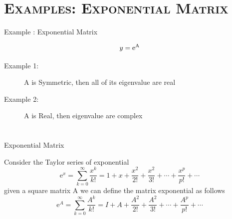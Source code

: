\documentclass[xcolor=x11names,compress]{beamer}
\renewcommand{\(}{\begin{columns}}
\renewcommand{\)}{\end{columns}}
\newcommand{\<}[1]{\begin{column}{#1}}
\renewcommand{\>}{\end{column}}
\begin{document}
\section{\scshape Examples:  Exponential Matrix}
\begin{frame}[fragile]{Example : Exponential Matrix}
\begin{huge}\begin{equation*}
 y=\rm{e}^{A}
\end{equation*}\end{huge}


\begin{description}
\item [Example 1:] A is Symmetric, then all of its eigenvalue are real
\item [Example 2:] A is Real, then eigenvalue are complex
\end{description}
\end{frame}
\section{}
\begin{frame}{Exponential Matrix}
\begin{small}Consider the Taylor series of exponential 
\begin{equation*}
 \mathrm{e}^x = \displaystyle\sum_{k=0}^{\infty}\frac{x^k}{k!}  =  1 + x + \frac{x^2}{2!} +\frac{x^2}{3!} + \cdots + \frac{x^p}{p!}+\cdots
\end{equation*}
given a square matrix A we can define the matrix exponential as follows
\begin{equation*}
 \mathrm{e}^A = \displaystyle\sum_{k=0}^{\infty}\frac{A^k }{k!} =  I + A + \frac{A^2}{2!} +\frac{A^2}{3!} + \cdots + \frac{A^p}{p!}+\cdots
\end{equation*}\end{small}         
\end{frame}
\end{document}
